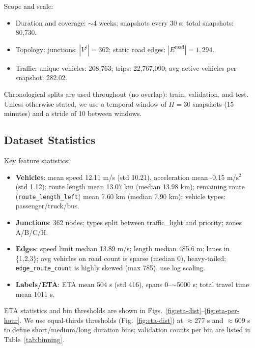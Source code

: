 Scope and scale:
\begin{itemize}
    \item Duration and coverage: $\sim$4 weeks; snapshots every 30 s; total snapshots: 80{,}730.
    \item Topology: junctions: $|V^j|{=}362$; static road edges: $|E^{\mathrm{road}}|{=}1{,}294$.
    \item Traffic: unique vehicles: 208{,}763; trips: 22{,}767{,}090; avg active vehicles per snapshot: 282.02.
\end{itemize}

Chronological splits are used throughout (no overlap): train, validation, and test. Unless otherwise stated, we use a temporal window of $H{=}30$ snapshots (15 minutes) and a stride of 10 between windows.

\subsection{Dataset Statistics}
Key feature statistics:
\begin{itemize}
    \item \textbf{Vehicles}: mean speed 12.11 m/s (std 10.21), acceleration mean -0.15 m/s$^2$ (std 1.12); route length mean 13.07 km (median 13.98 km); remaining route (\texttt{route\_length\_left}) mean 7.60 km (median 7.90 km); vehicle types: passenger/truck/bus.
    \item \textbf{Junctions}: 362 nodes; types split between traffic\_light and priority; zones A/B/C/H.
    \item \textbf{Edges}: speed limit median 13.89 m/s; length median 485.6 m; lanes in \{1,2,3\}; avg vehicles on road count is sparse (median 0), heavy-tailed; \texttt{edge\_route\_count} is highly skewed (max 785), use log scaling.
    \item \textbf{Labels/ETA}: ETA mean 504 s (std 416), spans 0--$\sim$5000 s; total travel time mean 1011 s.
\end{itemize}
ETA statistics and bin thresholds are shown in Figs.~\ref{fig:eta-dist}--\ref{fig:eta-per-hour}. We use equal-thirds thresholds (Fig.~\ref{fig:eta-dist}) at $\approx$277 s and $\approx$609 s to define short/medium/long duration bins; validation counts per bin are listed in Table~\ref{tab:binning}.

